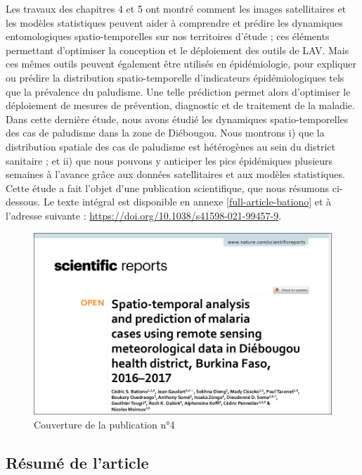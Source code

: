 \documentclass[12pt,twoside]{reedthesis}
\begin{document}
Les travaux des chapitres 4 et 5 ont montré comment les images satellitaires et les modèles statistiques peuvent aider à comprendre et prédire les dynamiques entomologiques spatio-temporelles sur nos territoires d'étude ; ces éléments permettant d'optimiser la conception et le déploiement des outils de LAV. Mais ces mêmes outils peuvent également être utilisés en épidémiologie, pour expliquer ou prédire la distribution spatio-temporelle d'indicateurs épidémiologiques tels que la prévalence du paludisme. Une telle prédiction permet alors d'optimiser le déploiement de mesures de prévention, diagnostic et de traitement de la maladie. Dans cette dernière étude, nous avons étudié les dynamiques spatio-temporelles des cas de paludisme dans la zone de Diébougou. Nous montrons i) que la distribution spatiale des cas de paludisme est hétérogènes au sein du district sanitaire ; et ii) que nous pouvons y anticiper les pics épidémiques plusieurs semaines à l'avance grâce aux données satellitaires et aux modèles statistiques. Cette étude a fait l'objet d'une publication scientifique, que nous résumons ci-dessous. Le texte intégral est disponible en annexe \ref{full-article-bationo} et à l'adresse suivante : \url{https://doi.org/10.1038/s41598-021-99457-9}.\\
\begin{figure}

{\centering \includegraphics[width=1\linewidth]{figure/article2_couverture} 

}

\caption[Couverture de la publication n°4]{Couverture de la publication n°4}\label{fig:couv-art2}
\end{figure}
\hypertarget{ruxe9sumuxe9-de-larticle-1}{%
\subsection{Résumé de l'article}\label{ruxe9sumuxe9-de-larticle-1}}
\end{document}
